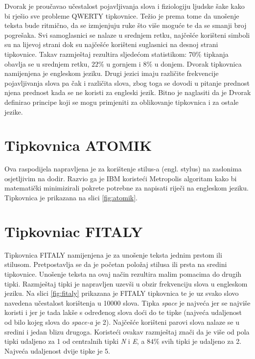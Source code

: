 \documentclass[times, utf8, zavrsni, numeric]{fer}
\begin{document}
Dvorak je proučavao učestalost pojavljivanja slova i fiziologiju ljudske šake kako bi rješio sve probleme QWERTY tipkovnice. Težio je prema tome da unošenje teksta bude ritmično, da se izmjenjuju ruke što više moguće te da se smanji broj pogrešaka. Svi samoglasnici se nalaze u srednjem retku, najčešće korišteni simboli su na lijevoj strani dok su najčešće korišteni suglasnici na desnoj strani tipkovnice. Takav razmještaj rezultira sljedećom statistikom: $70\%$ tipkanja obavlja se u srednjem retku, $22\%$ u gornjem i $8\%$ u donjem.  Dvorak tipkovnica namijenjena je engleskom jeziku. Drugi jezici imaju različite frekvencije pojavljivanja slova pa čak i različita slova, zbog toga se dovodi u pitanje prednost njena prednost kada se ne koristi za engleski jezik. Bitno je naglasiti da je Dvorak definirao principe koji se mogu primjeniti za oblikovanje tipkovnica i za ostale jezike.

\section{Tipkovnica ATOMIK}
Ova raspodijela napravljena je za korištenje stilus-a (engl. stylus) na zaslonima osjetljivim na dodir. Razvio ga je IBM koristeći Metropolis algoritam kako bi matematički minimizirali pokrete potrebne za napisati riječi na engleskom jeziku. Tipkovnica je prikazana na slici \ref{fig:atomik}.

\section{Tipkovniac FITALY}
Tipkovnica FITALY namijenjena je za unošenje teksta jednim prstom ili stilusom. Pretpostavlja se da je početan položaj stilusa ili prsta na sredini tipkovnice. Unošenje teksta na ovaj način rezultira malim pomacima do drugih tipki. Razmještaj tipki je napravljen uzevši u obzir frekvenciju slova u engleskom jeziku. Na slici \ref{fig:fitaly} prikazana je FITALY tipkovnica te je uz svako slovo navedena učestalost korištenja u 10000 slova. Tipka \emph{space} je najveća jer se najviše koristi i jer je tada lakše s određenog slova doći do te tipke (najveća udaljenost od bilo kojeg slova do \emph{space-a} je 2). Najčešće korišteni parovi slova nalaze se u sredini i jedan blizu drugoga. Koristeći ovakav razmještaj znači da je više od pola tipki udaljeno za 1 od centralnih tipki \emph{N} i \emph{E}, a $84\%$ svih tipki je udaljeno za 2. Najveća udaljenost dvije tipke je 5.
\end{document}
